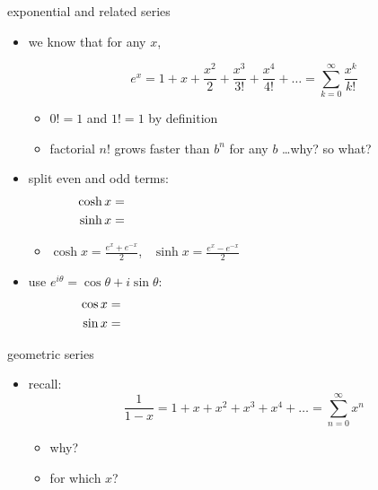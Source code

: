 \documentclass[urlcolor=blue,dvipsnames]{beamer}
\begin{document}
\begin{frame}{exponential and related series}

\begin{itemize}
\item we know that for any $x$,

\vspace{-2mm}
    $$e^x = 1 + x + \frac{x^2}{2} + \frac{x^3}{3!} + \frac{x^4}{4!} + \dots = \sum_{k=0}^\infty \frac{x^k}{k!}$$

\vspace{-3mm}
    \begin{itemize}
    \item $0!=1$ and $1!=1$ by definition
    \item factorial $n!$ grows faster than $b^n$ for any $b$ \dots why? so what?
    \end{itemize}
\item split even and odd terms:
\begin{align*}
\cosh x &= \hspace{80mm} \\
\sinh x &=
\end{align*}

\vspace{-3mm}
    \begin{itemize}
    \item $\displaystyle \cosh x = \frac{e^x+e^{-x}}{2}$, \, $\displaystyle \sinh x = \frac{e^x-e^{-x}}{2}$
    \end{itemize}
\item use $e^{i\theta} = \cos\theta + i \sin\theta$:
\begin{align*}
\cos x &= \hspace{80mm} \\
\sin x &=
\end{align*}
    
\end{itemize}
\end{frame}


\begin{frame}{geometric series}

\begin{itemize}
\item recall:
    $$\frac{1}{1-x} = 1 + x + x^2 + x^3 + x^4 + \dots = \sum_{n=0}^\infty x^n$$

\vspace{-3mm}
    \begin{itemize}
    \item why?

\vspace{20mm}
    \item for which $x$?
    \end{itemize}

\vspace{20mm}
\end{itemize}
\end{frame}
\end{document}
